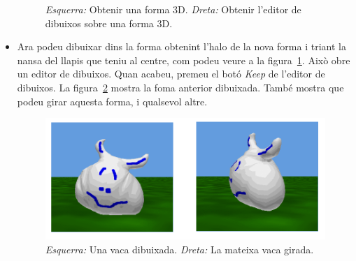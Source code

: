 \begin{itemize}
\begin{figure}[h!]
\begin{center}
\end{center}
\caption{\emph{Esquerra:} Obtenir una forma 3D.
\emph{Dreta:} Obtenir l'editor de dibuixos sobre una forma 3D.}
\label{fig2515}
\end{figure}
\item Ara podeu dibuixar dins la forma obtenint l'halo de la nova forma i triant la nansa del llapis que teniu al centre, com podeu veure a la figura~\ref{fig2515}. Això obre un editor de dibuixos. Quan acabeu, premeu el botó \emph{Keep} de l'editor de dibuixos. La figura~\ref{fig2516} mostra la foma anterior dibuixada. També mostra que podeu girar aquesta forma, i qualsevol altre.
\begin{figure}[h!]
\begin{center}
\includegraphics[scale=1.25]{Imatges/figura25-16}
\end{center}
\caption{\emph{Esquerra:} Una vaca dibuixada.
\emph{Dreta:} La mateixa vaca girada.}
\label{fig2516}
\end{figure}
\end{itemize}

